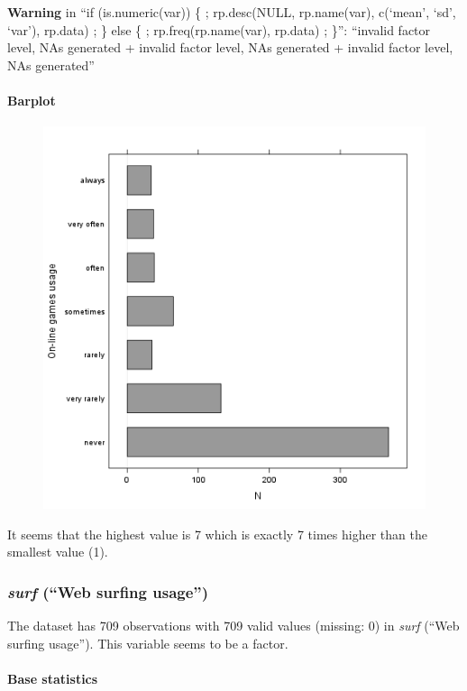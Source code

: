 \documentclass{article}
\makeatletter
\def\maxwidth{\ifdim\Gin@nat@width>\linewidth\linewidth
\else\Gin@nat@width\fi}
\let\Oldincludegraphics\includegraphics
\renewcommand{\includegraphics}[1]{\Oldincludegraphics[width=\maxwidth]{#1}}
\makeatother
\begin{document}
\textbf{Warning} in ``if (is.numeric(var)) \{ ; rp.desc(NULL,
rp.name(var), c(`mean', `sd', `var'), rp.data) ; \} else \{ ;
rp.freq(rp.name(var), rp.data) ; \}'': ``invalid factor level, NAs
generated + invalid factor level, NAs generated + invalid factor level,
NAs generated''

\paragraph{Barplot}

\begin{figure}[htbp]
\centering
\includegraphics{db92f166fe1966dbd5c6f0b909c181b2.png}
\caption{}
\end{figure}

It seems that the highest value is 7 which is exactly 7 times higher
than the smallest value (1).

\subsubsection{\emph{surf} (``Web surfing usage'')}

The dataset has 709 observations with 709 valid values (missing: 0) in
\emph{surf} (``Web surfing usage''). This variable seems to be a factor.

\paragraph{Base statistics}
\end{document}
